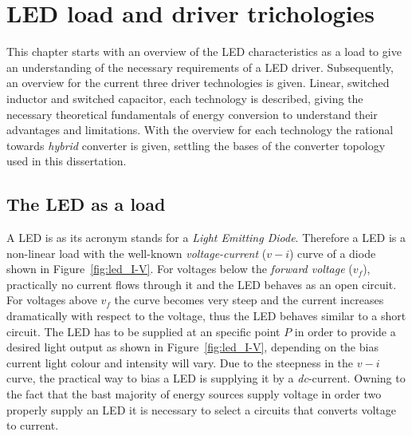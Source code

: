 \chapter{LED load and driver trichologies }
\label{ch:driver_tech}
%

This chapter starts with an overview of the LED characteristics as a load to give an understanding of the necessary requirements of a LED driver. Subsequently, an overview for the current three driver technologies is given. Linear, switched inductor and switched capacitor, each technology is described, giving the necessary theoretical fundamentals of energy conversion to understand their advantages and limitations.  With the overview for each technology the rational towards \emph{hybrid} converter is given, settling the bases of the converter topology used in this dissertation.

\section{The LED as a load}
\label{sc:LED_load}
A LED is as its acronym stands for a \emph{Light Emitting Diode}. Therefore a LED is a non-linear load with the well-known \emph{voltage-current} ($v-i$) curve of a diode shown in Figure~\ref{fig:led_I-V}. For voltages below the \emph{forward voltage} ($v_{f}$), practically no current flows through it and the LED behaves as an open circuit. For voltages above $v_{f}$ the curve becomes very steep and the current increases dramatically with respect to the voltage, thus the LED behaves similar to a short circuit. The LED has to be supplied at an specific point $P$ in order to provide a desired light output as shown in Figure~\ref{fig:led_I-V}, depending on the bias current light colour and intensity will vary. Due to the steepness in the $v-i$ curve, the practical way to bias a LED is supplying it by a \emph{dc}-current. Owning to the fact that the bast majority of energy sources supply voltage in order two properly supply an LED  it is necessary to select a circuits that converts voltage to current.

